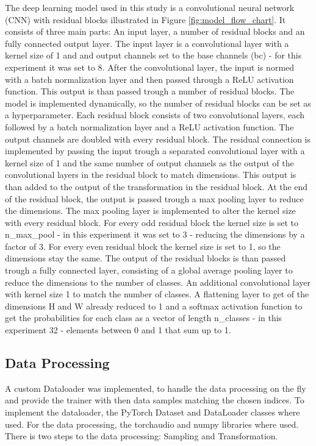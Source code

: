 The deep learning model used in this study is a convolutional neural network (CNN) with residual blocks
illustrated in Figure \ref{fig:model_flow_chart}. It consists of three main parts: An input layer,
a number of residual blocks and an fully connected output layer. The input layer is a convolutional layer with a kernel
size of 1 and and output channels set to the base channels (bc) - for this experiment it was set to 8.
After the convolutional layer, the input is normed with a batch normalization layer and then passed through
a ReLU activation function. This output is than passed trough a number of residual blocks. The model is
implemented dynamically, so the number of residual blocks can be set as a hyperparameter. Each residual block
consists of two convolutional layers, each followed by a batch normalization layer and a ReLU activation function.
The output channels are doubled with every residual block.
The residual connection is implemented by passing the input trough a separated convolutional layer with a kernel size of 1
and the same number of output channels as the output of the convolutional layers in the residual block to
match dimensions. This output is than added to the output of the transformation in the residual block.
At the end of the residual block, the output is passed trough a max pooling layer to reduce the dimensions.
The max pooling layer is implemented to alter the kernel size with every residual block. For every odd residual block
the kernel size is set to n\_max\_pool - in this experiment it was set to 3 - reducing the dimensions by a factor of 3.
For every even residual block the kernel size is set to 1, so the dimensions stay the same. The output of the residual blocks
is than passed trough a fully connected layer, consisting of a 
global average pooling layer to reduce the dimensions to the number of classes. An additional
convolutional layer with kernel size 1 to match the number of classes. A flattening layer to get of the dimensions H and W
already reduced to 1 and a softmax activation function to get the probabilities for each class as a vector of length n\_classes
- in this experiment 32 - elements between 0 and 1 that sum up to 1.

\subsection{Data Processing}%
A custom Dataloader was implemented, to handle the data processing on the fly
and provide the trainer with then data samples matching the chosen indices.
To implement the dataloader, the PyTorch Dataset and DataLoader classes where used.
For the data processing, the torchaudio and numpy libraries where used.
There is two steps to the data processing: Sampling and Transformation.

